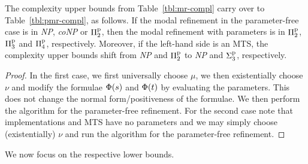 \begin{proposition}
The complexity upper bounds from Table~\ref{tbl:mr-compl} carry over to Table~\ref{tbl:pmr-compl},
as follows.
If the modal refinement in the parameter-free case is in \emph{NP}, 
\emph{coNP} or $\mathrm\Pi^\mathrm p_2$,
then the modal refinement with parameters is in $\mathrm\Pi^\mathrm p_2$, $\mathrm\Pi^\mathrm p_3$ and 
$\mathrm\Pi^\mathrm p_4$, respectively.
Moreover, if the left-hand side is an MTS, the complexity upper bounds shift
from \emph{NP} and $\mathrm\Pi^\mathrm p_2$ to \emph{NP} and $\mathrm\Sigma^\mathrm p_3$, respectively.
\end{proposition}
\begin{proof}
In the first case, we first universally choose $\mu$, we then 
existentially choose $\nu$ and modify the formulae $\mathrm{\Phi}(s)$ and $\mathrm{\Phi}(t)$ 
by evaluating the parameters. This does not change the normal 
form/positiveness of the formulae.
We then perform the algorithm for the parameter-free refinement.
For the second case note that implementations and MTS have no parameters and
we may simply choose (existentially) $\nu$ and run the algorithm for the
parameter-free refinement. %

\end{proof}

We now focus on the respective lower bounds.


